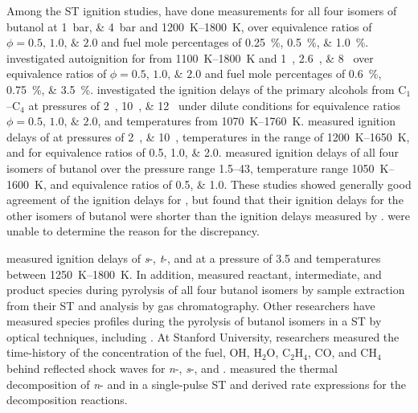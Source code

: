 \documentclass[../main.tex]{subfiles}
\begin{document}
Among the ST ignition studies, \textcite{Moss2008} have done
measurements for all four isomers of butanol at \SIlist{1;4}{\bar} and
\SIrange{1200}{1800}{\kelvin}, over equivalence ratios of $\phi = \numlist{0.5;1.0;2.0}$
and fuel mole percentages of \SIlist{0.25;0.5;1.0}{\percent}.
\textcite{Black2010} investigated autoignition for \nBuOH{} from
\SIrange{1100}{1800}{\kelvin} and \SIlist{1;2.6;8}{\atmosphere} over equivalence ratios of
$\phi = \numlist{0.5;1.0;2.0}$ and fuel mole percentages of \SIlist{0.6;0.75;3.5}{\percent}.
\textcite{Noorani2010} investigated the ignition delays of the primary alcohols
from C$_1$--C$_4$ at pressures of \SIlist{2;10;12}{\atmosphere} under dilute
conditions for equivalence ratios $\phi = \numlist{0.5;1.0;2.0}$, and temperatures
from \SIrange{1070}{1760}{\kelvin}. \textcite{Zhang2012} measured ignition
delays of \nBuOH{} at pressures of \SIlist{2;10}{\atmosphere},
temperatures in the range of \SIrange{1200}{1650}{\kelvin}, and for equivalence
ratios of \numlist{0,5;1.0;2.0}. \textcite{Stranic2012} measured ignition
delays of all four isomers of butanol over the pressure range \SIrange{1.5}{43}{\atmosphere},
temperature range \SIrange{1050}{1600}{\kelvin}, and equivalence ratios of
\numlist{0.5;1.0}. These studies showed generally good agreement of
the ignition delays for \nBuOH{}, but \textcite{Stranic2012}
found that their ignition delays for the other isomers of butanol were
shorter than the ignition delays measured by \textcite{Moss2008}.
\textcite{Stranic2012} were unable to determine the reason for the
discrepancy.

\textcite{Yasunaga2012} measured ignition delays of \textit{s}-,
\textit{t}-, and \iBuOH{} at a pressure of \SI{3.5}{\atmosphere}
and temperatures between \SIrange{1250}{1800}{\kelvin}. In addition,
\textcite{Yasunaga2012} measured reactant, intermediate, and product
species during pyrolysis of all four butanol isomers by sample extraction
from their ST and analysis by gas chromatography. Other researchers
have measured species profiles during the pyrolysis of butanol isomers
in a ST by optical techniques, including \textcite{Cook2012, Stranic2012a, Stranic2013,
Rosado-Reyes2012a, Rosado-Reyes2012}. At Stanford University, researchers
measured the time-history of the concentration of the fuel, OH, H$_2$O, C$_2$H$_4$, CO, and CH$_4$
behind reflected shock waves for \textit{n}-, \textit{s}-,
and \iBuOH{} \cite{Cook2012, Stranic2012a, Stranic2013}.
\textcite{Rosado-Reyes2012a, Rosado-Reyes2012} measured the thermal
decomposition of \textit{n}- and \sBuOH{} in a
single-pulse ST and derived rate expressions for the decomposition
reactions.
\end{document}
